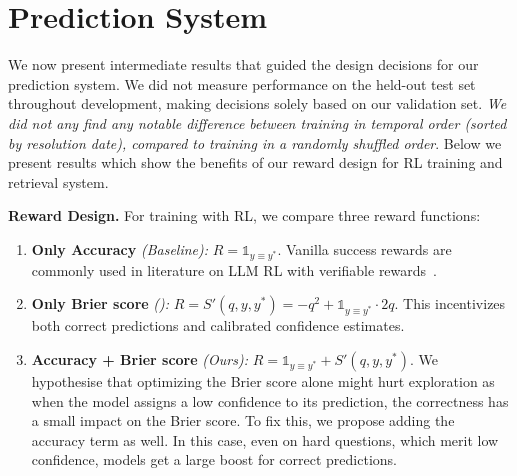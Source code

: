 \section{Prediction System}
\label{sec:predict}

 We now present intermediate results that guided the design decisions for our prediction system. We did not measure performance on the held-out test set throughout development, making decisions solely based on our validation set. \emph{We did not any find any notable difference between training in temporal order (sorted by resolution date), compared to training in a randomly shuffled order}. Below we present results which show the benefits of our reward design for RL training and retrieval system.  \vspace{0.15cm}

\textbf{Reward Design.} For training with RL, we compare three reward functions:
\begin{enumerate}
  \item \textbf{Only Accuracy} \textit{(Baseline):} \( R = \mathds{1}_{y \equiv y^*} \). Vanilla success rewards are commonly used in literature on LLM RL with verifiable rewards~\citep{guo2025deepseek}.
  \item \textbf{Only Brier score} \textit{(\citet{damani2025beyond}):} \( R = S'(q, y, y^*) = -q^2 + \mathds{1}_{y \equiv y^*}\cdot 2q \). This incentivizes both correct predictions and calibrated confidence estimates.
  \item \textbf{Accuracy + Brier score} \textit{(Ours):} \( R = \mathds{1}_{y \equiv y^*} + S'(q, y, y^*) \). We hypothesise that optimizing the Brier score alone might hurt exploration as when the model assigns a low confidence to its prediction, the correctness has a small impact on the Brier score. To fix this, we propose adding the accuracy term as well. In this case, even on hard questions, which merit low confidence, models get a large boost for correct predictions.
\end{enumerate}

